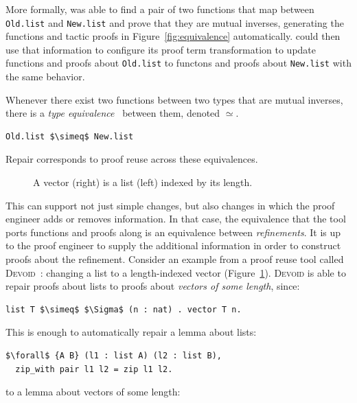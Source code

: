 More formally, \toolname was able to find a pair of two functions that map between \lstinline{Old.list}
and \lstinline{New.list} and prove that they are mutual inverses, generating the functions and tactic
proofs in Figure~\ref{fig:equivalence} automatically.
\toolname could then use that information to configure its proof term transformation to update
functions and proofs about \lstinline{Old.list} to functons and proofs about \lstinline{New.list} with
the same behavior.

Whenever there exist two functions between two types that are mutual inverses,
there is a \textit{type equivalence}~\cite{univalent2013homotopy} between them, denoted $\simeq$.

\begin{lstlisting}
Old.list $\simeq$ New.list
\end{lstlisting}
Repair corresponds to proof reuse across these equivalences.

\begin{figure}
\begin{minipage}{0.40\textwidth}
   
\end{minipage}
\hfill
\begin{minipage}{0.58\textwidth}
   
\end{minipage}
\vspace{-0.2cm}
\caption{A vector (right) is a list (left) indexed by its length.}
\label{fig:listtovect}
\end{figure}

This can support not just simple changes, but also changes in which the proof engineer adds or removes information.
In that case, the equivalence that the tool ports functions and proofs along
is an equivalence between \textit{refinements}.
It is up to the proof engineer to supply the additional information in order to construct proofs about the refinement.
Consider an example from a proof reuse tool called \textsc{Devoid}~\cite{Ringer2019}:
changing a list to a length-indexed vector (Figure~\ref{fig:listtovect}).
\textsc{Devoid} is able to repair proofs about lists to proofs about \textit{vectors of some length}, since:

\begin{lstlisting}
list T $\simeq$ $\Sigma$ (n : nat) . vector T n.
\end{lstlisting}
This is enough to automatically repair a lemma about lists:

\begin{lstlisting}
$\forall$ {A B} (l1 : list A) (l2 : list B),
  zip_with pair l1 l2 = zip l1 l2.
\end{lstlisting}
to a lemma about vectors of some length:

